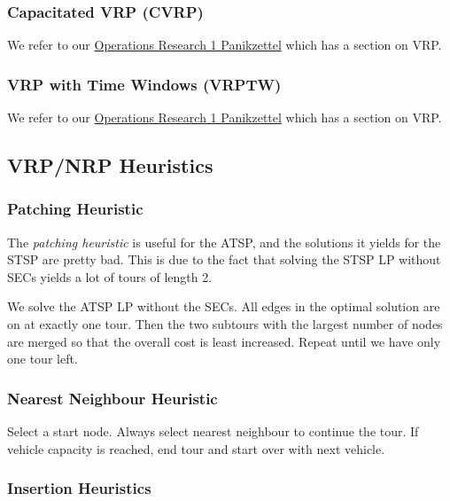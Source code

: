 \documentclass[english]{panikzettel}
\begin{document}
\subsubsection{Capacitated VRP (CVRP)}

We refer to our \href{https://panikzettel.philworld.de/or1.pdf}{Operations Research 1 Panikzettel} which has a section on VRP.

\subsubsection{VRP with Time Windows (VRPTW)}

We refer to our \href{https://panikzettel.philworld.de/or1.pdf}{Operations Research 1 Panikzettel} which has a section on VRP.

\subsection{VRP/NRP Heuristics}

\subsubsection{Patching Heuristic}

The \emph{patching heuristic} is useful for the ATSP, and the solutions it yields for the STSP are pretty bad.
This is due to the fact that solving the STSP LP without SECs yields a lot of tours of length 2.

We solve the ATSP LP without the SECs.
All edges in the optimal solution are on at exactly one tour.
Then the two subtours with the largest number of nodes are merged so that the overall cost is least increased.
Repeat until we have only one tour left.

\subsubsection{Nearest Neighbour Heuristic}

Select a start node.
Always select nearest neighbour to continue the tour.
If vehicle capacity is reached, end tour and start over with next vehicle.

\subsubsection{Insertion Heuristics}
\end{document}
